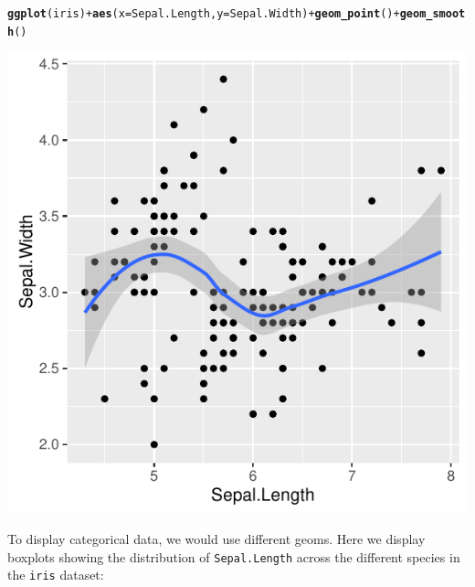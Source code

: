 \documentclass[12pt]{article}\usepackage[]{graphicx}\usepackage[]{color}
\makeatletter
\def\maxwidth{ %
  \ifdim\Gin@nat@width>\linewidth
    \linewidth
  \else
    \Gin@nat@width
  \fi
}
\newcommand{\hlopt}[1]{\textcolor[rgb]{0,0,0}{#1}}%
\newcommand{\hlstd}[1]{\textcolor[rgb]{0.345,0.345,0.345}{#1}}%
\newcommand{\hlkwc}[1]{\textcolor[rgb]{0.333,0.667,0.333}{#1}}%
\newcommand{\hlkwd}[1]{\textcolor[rgb]{0.737,0.353,0.396}{\textbf{#1}}}%
\newenvironment{kframe}{%
 \def\at@end@of@kframe{}%
 \ifinner\ifhmode%
  \def\at@end@of@kframe{\end{minipage}}%
  \begin{minipage}{\columnwidth}%
 \fi\fi%
 \def\FrameCommand##1{\hskip\@totalleftmargin \hskip-\fboxsep
 \colorbox{shadecolor}{##1}\hskip-\fboxsep
     \hskip-\linewidth \hskip-\@totalleftmargin \hskip\columnwidth}%
 \MakeFramed {\advance\hsize-\width
   \@totalleftmargin\z@ \linewidth\hsize
   \@setminipage}}%
 {\par\unskip\endMakeFramed%
 \at@end@of@kframe}
\newenvironment{knitrout}{}{} %
\makeatother
\begin{document}
\begin{knitrout}
\color{fgcolor}\begin{kframe}
\begin{alltt}
\hlkwd{ggplot}\hlstd{(iris)} \hlopt{+} \hlkwd{aes}\hlstd{(}\hlkwc{x} \hlstd{= Sepal.Length,} \hlkwc{y} \hlstd{= Sepal.Width)} \hlopt{+} \hlkwd{geom_point}\hlstd{()} \hlopt{+} \hlkwd{geom_smooth}\hlstd{()}
\end{alltt}
\end{kframe}
\includegraphics[width=\maxwidth]{figure/unnamed-chunk-5-1} 

\end{knitrout}


To display categorical data, we would use different geoms. Here we display boxplots showing the distribution of \texttt{Sepal.Length} across the different species in the \texttt{iris} dataset:
\end{document}
